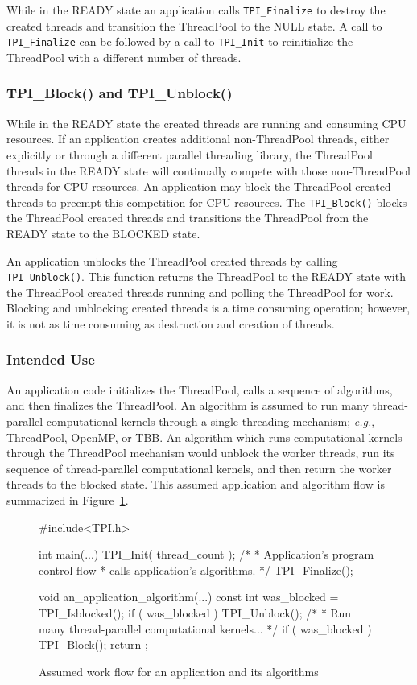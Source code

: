While in the READY state an application calls \texttt{TPI\_Finalize} to destroy the created threads and transition the ThreadPool to the NULL state.
%
A call to \texttt{TPI\_Finalize} can be followed by a call to \texttt{TPI\_Init} to reinitialize the ThreadPool with a different number of threads.


\subsubsection{TPI\_Block() and TPI\_Unblock()}

While in the READY state the created threads are running and consuming CPU resources.
%
If an application creates additional non-ThreadPool threads, either explicitly or through a different parallel threading library, the ThreadPool threads in the READY state will continually compete with those non-ThreadPool threads for CPU resources.
%
An application may block the ThreadPool created threads to preempt this competition for CPU resources.
%
The \texttt{TPI\_Block()} blocks the ThreadPool created threads and transitions the ThreadPool from the READY state to the BLOCKED state.


An application unblocks the ThreadPool created threads by calling \texttt{TPI\_Unblock()}.
%
This function returns the ThreadPool to the READY state with the ThreadPool created threads running and polling the ThreadPool for work.
%
Blocking and unblocking created threads is a time consuming operation; however, it is not as time consuming as destruction and creation of threads.


\subsubsection{Intended Use}

An application code initializes the ThreadPool, calls a sequence of algorithms, and then finalizes the ThreadPool.
%
An algorithm is assumed to run many thread-parallel computational kernels through a single threading mechanism; \emph{e.g.}, ThreadPool, OpenMP, or TBB.
%
An algorithm which runs computational kernels through the ThreadPool mechanism would unblock the worker threads, run its sequence of thread-parallel computational kernels, and then return the worker threads to the blocked state.
%
This assumed application and algorithm flow is summarized in Figure~\ref{fig:WorkFlow}.

\begin{figure}[h]
\center
\small 
\begin{boxedverbatim}
#include<TPI.h>

int main(...)
{
  TPI_Init( thread_count );
  /* 
   *  Application's program control flow
   *  calls application's algorithms. 
   */
  TPI_Finalize();
}

void an_application_algorithm(...)
{
  const int was_blocked = TPI_Isblocked();
  if ( was_blocked ) TPI_Unblock();
  /* 
   *  Run many thread-parallel computational kernels... 
   */
  if ( was_blocked ) TPI_Block();
  return ;
}
\end{boxedverbatim}
\caption{Assumed work flow for an application and its algorithms}
\label{fig:WorkFlow}
\end{figure}


